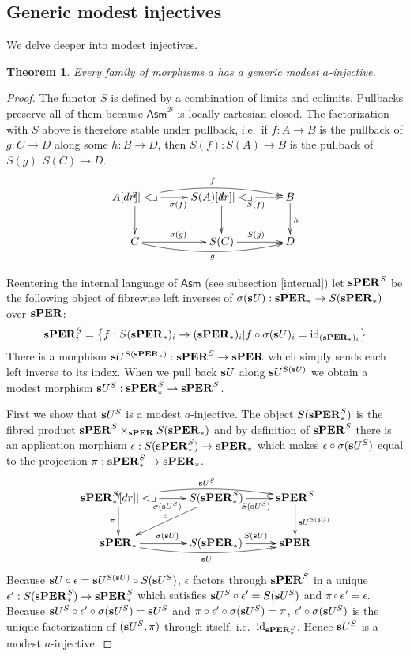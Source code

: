 \documentclass{amsart}
\theoremstyle{plain}
\newtheorem{theorem}{Theorem}
\theoremstyle{definition}
\newcommand\hide[1]{}
\newcommand\cat\mathcal
\newcommand\set[1]{\left\{#1\right\}}
\newcommand\id{\mathrm{id}}
\newcommand\Asm{\mathsf{Asm}}
\begin{document}
\subsection{Generic modest injectives} We delve deeper into modest injectives.

\begin{theorem} Every family of morphisms $a$ has a generic modest $a$-injective. \label{geninjmod} \end{theorem}

\begin{proof} The functor $S$ is defined by a combination of limits and colimits. Pullbacks preserve all of them because $\Asm^{\cat B}$ is locally cartesian closed. The factorization with $S$ above is therefore stable under pullback, i.e.\ if $f: A\to B$ is the pullback of $g:C\to D$ along some $h:B\to D$, then $S(f):S(A)\to B$ is the pullback of $S(g):S(C) \to D$.
\[\xymatrix{
A\ar[r]_{\sigma(f)} \ar@/^2ex/[rr]^{f}\ar[d]\pb & S(A) \ar[r]_{S(f)}\ar[d]\pb & B\ar[d]^h\\
C\ar[r]^{\sigma(g)} \ar@/_2ex/[rr]_{g} & S(C) \ar[r]^{S(g)} & D
}\]

Reentering the internal language of $\Asm$ (see subsection \ref{internal}) let $\mathbf{s}\mathbf{PER}^S$ be the following object of fibrewise left inverses of $\sigma(\mathbf{s} U):\mathbf{s}\mathbf{PER}_* \to S(\mathbf{s}\mathbf{PER}_*)$ over $\mathbf{s}\mathbf{PER}$:
\[ \rat\pers^S_i = \set{ f:S(\rat\pers_*)_i\to (\rat\pers_*)_i| f\circ\sigma(\rat U)_i = \id_{(\rat\pers_*)_i}} \] 
There is a morphism $\mathbf{s} U^{S(\mathbf{s}\mathbf{PER}_*)}:\mathbf{s}\mathbf{PER}^S\to \mathbf{s}\mathbf{PER}$ which simply sends each left inverse to its index.
When we pull back $\mathbf{s} U$ along $\mathbf{s} U^{S(\mathbf{s} U)}$ we obtain a modest morphism $\mathbf{s} U^S:\mathbf{s}\mathbf{PER}_*^S \to \mathbf{s}\mathbf{PER}^S$.

First we show that $\mathbf{s} U^S$ is a modest $a$-injective.
The object $S(\mathbf{s}\mathbf{PER}_*^S)$ is the fibred product $\mathbf{s}\mathbf{PER}^S\times_{\mathbf{s}\mathbf{PER}}S(\mathbf{s}\mathbf{PER}_*)$ and by definition of $\mathbf{s}\mathbf{PER}^S$ there is an application morphism $\epsilon:S(\mathbf{s}\mathbf{PER}_*^S)\to \mathbf{s}\mathbf{PER}_*$ which makes $\epsilon\circ \sigma(\mathbf{s} U^S)$ equal to the projection $\pi:\mathbf{s}\mathbf{PER}_*^S\to\mathbf{s}\mathbf{PER}_*$.
\[\xymatrix{
\rat\pers_*^S\ar[r]_{\sigma(\rat U^S)} \ar@/^2ex/[rr]^{\rat U^S}\ar[d]_\pi\pb & S(\rat\pers_*^S) \ar[r]_{S(\rat U^S)}\hide{\ar[d]_{(}^{)}\pb}\ar[dl]_\epsilon & \rat\pers^S\ar[d]^{\rat U^{S(\rat U)}}\\
\rat\pers_*\ar[r]^{\sigma(\rat U)} \ar@/_2ex/[rr]_{\rat U} & S(\rat\pers_*) \ar[r]^{S(\rat U)} & \rat\pers
}\]
\hide{Warning: in this diagram $\sigma(\rat U)\circ\epsilon$ is not equal to the projection $S(\rat\pers_*^S) \to S(\rat\pers_*)$, hence the parentheses in the diagram above. }Because $\mathbf{s} U\circ \epsilon = \mathbf{s} U^{S(\mathbf{s} U)}\circ S(\mathbf{s} U^S)$, $\epsilon$ factors through $\mathbf{s}\mathbf{PER}^S$ in a unique $\epsilon':S(\mathbf{s}\mathbf{PER}_*^S)\to\mathbf{s}\mathbf{PER}_*^S$ which satisfies $\mathbf{s} U^S\circ\epsilon' = S(\mathbf{s} U^S)$ and $\pi\circ \epsilon'= \epsilon$. Because $\mathbf{s} U^S\circ\epsilon'\circ \sigma(\mathbf{s} U^S) = \mathbf{s} U^S$ and $\pi\circ \epsilon'\circ \sigma(\mathbf{s} U^S) = \pi$, $\epsilon'\circ \sigma(\mathbf{s} U^S)$ is the unique factorization of $(\mathbf{s} U^S,\pi)$ through itself, i.e.\ $\id_{\rat\pers_*^S}$. Hence $\mathbf{s} U^S$ is a modest $a$-injective.


\end{proof}
\end{document}
